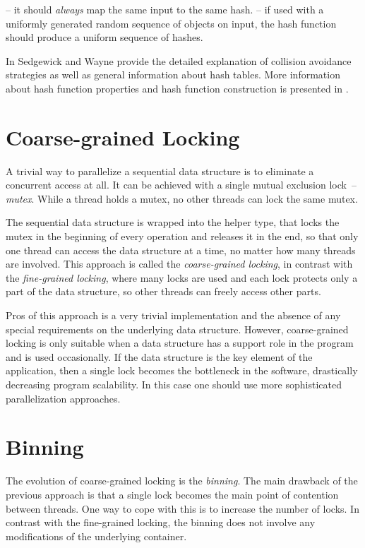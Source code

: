 \begin{block-description}
\blockitem[Determinism]-- it should \emph{always} map the same input to the same hash.
\blockitem[Uniformity]-- if used with a uniformly generated random sequence of objects on input, the hash function should produce a uniform sequence of hashes.
\end{block-description}

In \cite{sedgewick} Sedgewick and Wayne provide the detailed explanation of collision avoidance strategies as well as general information about hash tables. More information about hash function properties and hash function construction is presented in \cite{knott}.

\section{Coarse-grained Locking}

A trivial way to parallelize a sequential data structure is to eliminate a concurrent access at all. It can be achieved with a single mutual exclusion lock~-- \emph{mutex}.
While a thread holds a mutex, no other threads can lock the same mutex.

The sequential data structure is wrapped into the helper type, that locks the mutex in the beginning of every operation and releases it in the end, so that only one thread can access the data structure at a time, no matter how many threads are involved.
This approach is called the \emph{coarse-grained locking}, in contrast with the \emph{fine-grained locking}, where many locks are used and each lock protects only a part of the data structure, so other threads can freely access other parts.

Pros of this approach is a very trivial implementation and the absence of any special requirements on the underlying data structure. However, coarse-grained locking is only suitable when a data structure has a support role in the program and is used occasionally. If the data structure is the key element of the application, then a single lock becomes the bottleneck in the software, drastically decreasing program scalability. In this case one should use more sophisticated parallelization approaches.

\section{Binning}

The evolution of coarse-grained locking is the \emph{binning}. The main drawback of the previous approach is that a single lock becomes the main point of contention between threads. One way to cope with this is to increase the number of locks. In contrast with the fine-grained locking, the binning does not involve any modifications of the underlying container.

